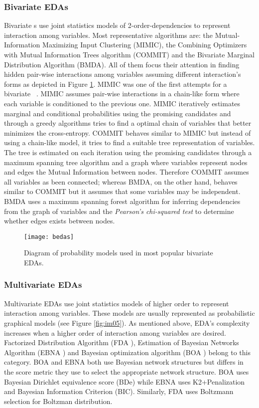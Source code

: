 \subsubsection{Bivariate EDAs}
Bivariate \EDA s use joint statistics models of 2-order-dependencies to represent interaction among variables.  Most representative algorithms are: the Mutual-Information Maximizing Input Clustering (MIMIC\cite{?}), the Combining Optimizers with Mutual Information Trees algorithm (COMMIT\cite{?}) and the  Bivariate Marginal Distribution Algorithm (BMDA\cite{?}). All of them focus their attention in finding hidden pair-wise interactions among variables assuming different interaction's forms as depicted in Figure \ref{fig:imbedas}. MIMIC was one of the first attempts for a bivariate \EDA~. MIMIC assumes pair-wise interactions in a chain-like form where each variable is conditioned to the previous one. MIMIC iteratively estimates marginal and conditional probabilities using the promising candidates and through a greedy algorithms tries to find a optimal chain of variables that better minimizes the cross-entropy.   COMMIT behaves similar to MIMIC but instead of using a chain-like model, it tries to find a suitable tree representation of variables.  The tree is estimated on each iteration using the promising candidates through a maximum spanning tree algorithm and a graph where variables represent nodes and edges the Mutual Information between nodes. Therefore COMMIT assumes all variables as been connected; whereas BMDA, on the other hand, behaves similar to COMMIT but it assumes that some variables may be independent.  BMDA uses a maximum spanning forest algorithm for inferring dependencies from the graph of variables and the \emph{Pearson's chi-squared test} to determine whether edges exists between nodes.

\begin{figure}[ht]
	\centering
		\texttt{[image: bedas]}
	\caption{Diagram of probability models used in most popular bivariate EDAs.}
	\label{fig:imbedas}
\end{figure}


\subsubsection{Multivariate EDAs}
Multivariate EDAs use joint statistics models of higher order to represent interaction among variables. These models are usually represented as probabilistic graphical models (see Figure \ref{fig:im05}). As mentioned above, EDA's complexity increases when a higher order of interaction among variables are desired. Factorized Distribution Algorithm (FDA \cite{muhlen99}), Estimation of Bayesian Networks Algorithm (EBNA \cite{larranaga00}) and Bayesian optimization algorithm (BOA \cite{pelikan99}) belong to this category.  BOA and EBNA both use Bayesian network structures but differs in the score metric they use to select the appropriate network structure.  BOA uses Bayesian Dirichlet equivalence score (BDe) while EBNA uses K2+Penalization and Bayesian Information Criterion (BIC).  Similarly, FDA uses Boltzmann selection for Boltzman distribution.

